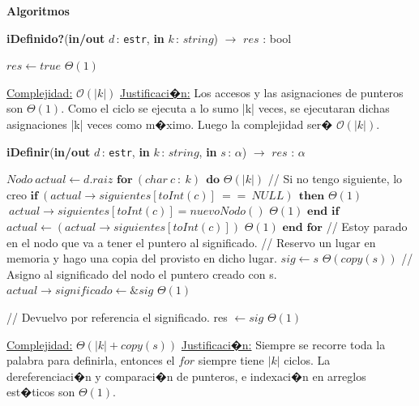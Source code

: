 \documentclass[a4paper,10pt]{article}
\let\TipoVariable=\texttt
\let\ModificadorArgumento=\textbf
\newcommand{\tab}{\hspace*{7mm}}
\newcommand{\ttab}{\tab \tab}
\newcommand{\In}[2]{\ModificadorArgumento{in} \ensuremath{#1}\,: \TipoVariable{#2}\xspace}
\newcommand{\Inout}[2]{\ModificadorArgumento{in/out} \ensuremath{#1}\,: \TipoVariable{#2}\xspace}
\newenvironment{Algoritmos}{%
  \vspace*{2ex}%
  \noindent\textbf{\Large Algoritmos}%
  \vspace*{2ex}%
}{}
\newcommand{\DRef}{\ensuremath{\rightarrow}}
\newcommand{\BigO}{\ensuremath{\mathcal{O}}}
\begin{document}
{\begin{Algoritmos}
\begin{algorithm}[H]{\textbf{iDefinido?}(\Inout{d}{estr}, \In{k}{$string$}) $\to$ $res$ : bool}
\begin{algorithmic}[1]
           \State $res \gets true$                                                                  \Comment $\Theta(1)$

          \medskip
          \Statex \underline{Complejidad:} $\BigO(|k|)$
          \Statex \underline{Justificaci�n:} Los accesos y las asignaciones de punteros son $\Theta(1)$. Como el ciclo se ejecuta a lo sumo |k| veces, se ejecutaran dichas asignaciones |k| veces como m�ximo. Luego la complejidad ser� $\BigO(|k|)$.
          \end{algorithmic}
    \end{algorithm}

    \begin{algorithm}[H]{\textbf{iDefinir}(\Inout{d}{estr}, \In{k}{$string$}, \In{s}{$\alpha$}) $\to$ $res$ : $\alpha$}
      \begin{algorithmic}[1]
          \State $Nodo \ actual \gets d.raiz$
          \State $\textbf{for} \ (char \ c \ : \ k) \ \ \textbf{do}$                                          \Comment $\Theta(|k|)$  
          \State \tab   // Si no tengo siguiente, lo creo
          \State \tab   $\textbf{if} \ (actual \DRef siguientes [toInt(c)] \ == \ NULL) \ \ \textbf{then}$    \Comment $\Theta(1)$
          \State \ttab  $\ actual \DRef siguientes[toInt(c)] = nuevoNodo()$                                   \Comment $\Theta(1)$
          \State \tab   $\textbf{end if}$
          \State \tab   $actual \gets (actual \DRef siguientes [toInt(c)])$                                   \Comment $\Theta(1)$
          \State $\textbf{end for}$  
          \State
          \State // Estoy parado en el nodo que va a tener el puntero al significado.
          \State // Reservo un lugar en memoria y hago una copia del provisto en dicho lugar.
          \State $sig \gets s$                                                                                \Comment $\Theta(copy(s))$
          \State // Asigno al significado del nodo el puntero creado con s.
          \State $actual \DRef significado \gets \&sig$                                                       \Comment $\Theta(1)$
          
          \State // Devuelvo por referencia el significado.
          \State res $\gets sig$                                                                              \Comment $\Theta(1)$

          \medskip
          \Statex \underline{Complejidad:} $\Theta(|k| + copy(s))$
          \Statex \underline{Justificaci�n:} Siempre se recorre toda la palabra para definirla, entonces el $for$ siempre tiene $|k|$ ciclos. La dereferenciaci�n y comparaci�n de punteros, e indexaci�n en arreglos est�ticos son $\Theta(1)$.
          \end{algorithmic}
    \end{algorithm}
  

\end{Algoritmos}}
\end{document}
